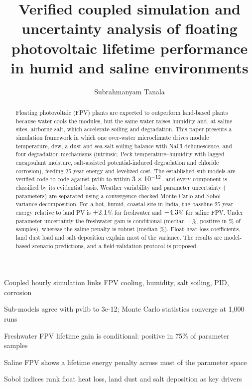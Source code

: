 \documentclass[preprint,11pt]{elsarticle}
\begin{document}

\begin{frontmatter}

\title{Verified coupled simulation and uncertainty analysis of floating photovoltaic lifetime performance in humid
and saline environments}

\author{Subrahmanyam Tanala}

\begin{abstract}
Floating photovoltaic (FPV) plants are expected to outperform land-based plants because water cools the modules, but
the same water raises humidity and, at saline sites, airborne salt, which accelerate soiling and degradation. This
paper presents a simulation framework in which one over-water microclimate drives module temperature, dew, a dust and
sea-salt soiling balance with NaCl deliquescence, and four degradation mechanisms (intrinsic, Peck
temperature--humidity with lagged encapsulant moisture, salt-assisted potential-induced degradation and chloride
corrosion), feeding 25-year energy and levelized cost. The established sub-models are verified code-to-code against
pvlib to within $3\times10^{-12}$, and every component is classified by its evidential basis. Weather variability and
parameter uncertainty (\NParams{} parameters) are separated using a convergence-checked Monte Carlo and Sobol variance
decomposition. For a hot, humid, coastal site in India, the baseline 25-year energy relative to land PV is
$+2.1$\% for freshwater and $-4.3$\% for saline FPV. Under parameter uncertainty the freshwater gain is
conditional (median $+$\MCLifeMedF\%, positive in \MCLifePosF\% of samples), whereas the saline penalty is robust
(median \MCLifeMedS\%). Float heat-loss coefficients, land dust load and salt deposition explain most of the variance.
The results are model-based scenario predictions, and a field-validation protocol is proposed.
\end{abstract}

\begin{highlights}
\item Coupled hourly simulation links FPV cooling, humidity, salt soiling, PID, corrosion
\item Sub-models agree with pvlib to 3e-12; Monte Carlo statistics converge at 1,000 runs
\item Freshwater FPV lifetime gain is conditional: positive in 75\% of parameter samples
\item Saline FPV shows a lifetime energy penalty across most of the parameter space
\item Sobol indices rank float heat loss, land dust and salt deposition as key drivers
\end{highlights}


\end{frontmatter}
\end{document}
